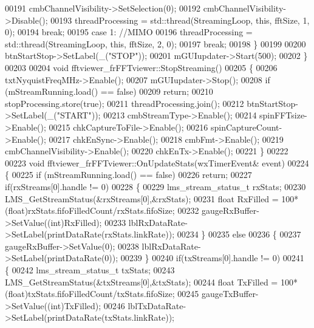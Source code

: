 \begin{DoxyCode}
00191             cmbChannelVisibility->SetSelection(0);
00192         cmbChannelVisibility->Disable();
00193         threadProcessing = std::thread(StreamingLoop, \textcolor{keyword}{this}, fftSize, 1, 0);
00194         \textcolor{keywordflow}{break};
00195     \textcolor{keywordflow}{case} 1: \textcolor{comment}{//MIMO}
00196         threadProcessing = std::thread(StreamingLoop, \textcolor{keyword}{this}, fftSize, 2, 0);
00197         \textcolor{keywordflow}{break};
00198     \}
00199 
00200     btnStartStop->SetLabel(\_(\textcolor{stringliteral}{"STOP"}));
00201     mGUIupdater->Start(500);
00202 \}
00203 
00204 \textcolor{keywordtype}{void} fftviewer_frFFTviewer::StopStreaming()
00205 \{
00206     txtNyquistFreqMHz->Enable();
00207     mGUIupdater->Stop();
00208     \textcolor{keywordflow}{if} (mStreamRunning.load() == \textcolor{keyword}{false})
00209         \textcolor{keywordflow}{return};
00210     stopProcessing.store(\textcolor{keyword}{true});
00211     threadProcessing.join();
00212     btnStartStop->SetLabel(\_(\textcolor{stringliteral}{"START"}));
00213     cmbStreamType->Enable();
00214     spinFFTsize->Enable();
00215     chkCaptureToFile->Enable();
00216     spinCaptureCount->Enable();
00217     chkEnSync->Enable();
00218     cmbFmt->Enable();
00219     cmbChannelVisibility->Enable();
00220     chkEnTx->Enable();
00221 \}
00222 
00223 \textcolor{keywordtype}{void} fftviewer_frFFTviewer::OnUpdateStats(wxTimerEvent& event)
00224 \{
00225     \textcolor{keywordflow}{if} (mStreamRunning.load() == \textcolor{keyword}{false})
00226         \textcolor{keywordflow}{return};
00227     \textcolor{keywordflow}{if}(rxStreams[0].handle != 0)
00228     \{
00229         lms_stream_status_t rxStats;
00230         LMS_GetStreamStatus(&rxStreams[0],&rxStats);
00231         \textcolor{keywordtype}{float} RxFilled = 100*(float)rxStats.fifoFilledCount/rxStats.fifoSize;
00232         gaugeRxBuffer->SetValue((\textcolor{keywordtype}{int})RxFilled);
00233         lblRxDataRate->SetLabel(printDataRate(rxStats.linkRate));
00234     \}
00235     \textcolor{keywordflow}{else}
00236     \{
00237         gaugeRxBuffer->SetValue(0);
00238         lblRxDataRate->SetLabel(printDataRate(0));
00239     \}
00240     \textcolor{keywordflow}{if}(txStreams[0].handle != 0)
00241     \{
00242         lms_stream_status_t txStats;
00243         LMS_GetStreamStatus(&txStreams[0],&txStats);
00244         \textcolor{keywordtype}{float} TxFilled = 100*(float)txStats.fifoFilledCount/txStats.fifoSize;
00245         gaugeTxBuffer->SetValue((\textcolor{keywordtype}{int})TxFilled);
00246         lblTxDataRate->SetLabel(printDataRate(txStats.linkRate));

\end{DoxyCode}
